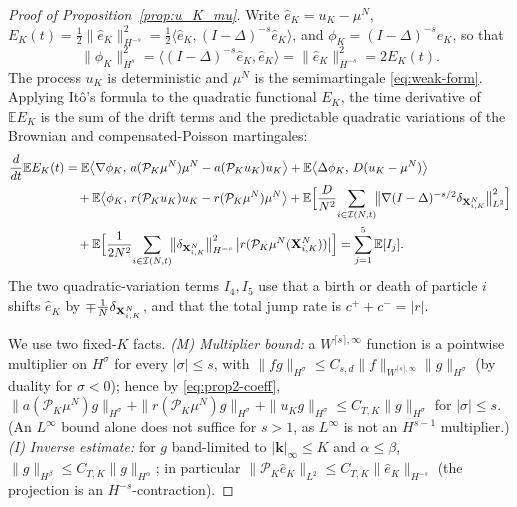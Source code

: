 \documentclass[a4paper,fleqn]{cas-sc}
\theoremstyle{definition}
\theoremstyle{remark}
\begin{document}
\begin{proof}[Proof of Proposition~\ref{prop:u_K_mu}]
Write $\hat e_K=u_K-\mu^N$, $E_K(t)=\tfrac12\|\hat e_K\|_{H^{-s}}^2
=\tfrac12\langle\hat e_K,(I-\Delta)^{-s}\hat e_K\rangle$, and
$\phi_K=(I-\Delta)^{-s}\hat e_K$, so that
\begin{equation}\label{eq:app-phi-id}
\|\phi_K\|_{H^s}^2=\langle(I-\Delta)^{-s}\hat e_K,\hat e_K\rangle=\|\hat e_K\|_{H^{-s}}^2=2E_K(t).
\end{equation}
The process $u_K$ is deterministic and $\mu^N$ is the semimartingale
\eqref{eq:weak-form}. Applying It\^o's formula to the quadratic functional $E_K$,
the time derivative of $\mathbb EE_K$ is the sum of the drift terms and the
predictable quadratic variations of the Brownian and compensated-Poisson
martingales:
\[
\begin{aligned}
\frac{d}{dt}\mathbb EE_K(t)
&=\mathbb E\bigl\langle\nabla\phi_K,\,a(\mathcal P_K\mu^N)\mu^N-a(\mathcal P_K u_K)u_K\bigr\rangle
 +\mathbb E\bigl\langle\Delta\phi_K,\,D(u_K-\mu^N)\bigr\rangle\\
&\quad+\mathbb E\bigl\langle\phi_K,\,r(\mathcal P_K u_K)u_K-r(\mathcal P_K\mu^N)\mu^N\bigr\rangle
 +\mathbb E\Bigl[\frac{D}{N^2}\!\sum_{i\in\mathcal I(N,t)}\!\bigl\|\nabla(I-\Delta)^{-s/2}\delta_{\mathbf{X}^N_{i,K}}\bigr\|_{L^2}^2\Bigr]\\
&\quad+\mathbb E\Bigl[\frac{1}{2N^2}\!\sum_{i\in\mathcal I(N,t)}\!\bigl\|\delta_{\mathbf{X}^N_{i,K}}\bigr\|_{H^{-s}}^2\,\bigl|r(\mathcal P_K\mu^N(\mathbf{X}^N_{i,K}))\bigr|\Bigr]
=\sum_{j=1}^5\mathbb E[I_j].
\end{aligned}
\]
The two quadratic-variation terms $I_4,I_5$ use that a birth or death of particle
$i$ shifts $\hat e_K$ by $\mp\tfrac1N\delta_{\mathbf{X}^N_{i,K}}$, and that the total
jump rate is $c^++c^-=|r|$.

We use two fixed-$K$ facts.
\emph{(M) Multiplier bound:} a $W^{\lceil s\rceil,\infty}$ function is a pointwise
multiplier on $H^\sigma$ for every $|\sigma|\le s$, with
$\|fg\|_{H^\sigma}\le C_{s,d}\|f\|_{W^{\lceil s\rceil,\infty}}\|g\|_{H^\sigma}$ (by
duality for $\sigma<0$); hence by \eqref{eq:prop2-coeff},
$\|a(\mathcal P_K\mu^N)g\|_{H^\sigma}+\|r(\mathcal P_K\mu^N)g\|_{H^\sigma}+\|u_K g\|_{H^\sigma}\le C_{T,K}\|g\|_{H^\sigma}$
for $|\sigma|\le s$. (An $L^\infty$ bound alone does not suffice for $s>1$, as
$L^\infty$ is not an $H^{s-1}$ multiplier.)
\emph{(I) Inverse estimate:} for $g$ band-limited to $|\mathbf k|_\infty\le K$ and
$\alpha\le\beta$, $\|g\|_{H^\beta}\le C_{T,K}\|g\|_{H^\alpha}$; in particular
$\|\mathcal P_K\hat e_K\|_{L^2}\le C_{T,K}\|\hat e_K\|_{H^{-s}}$ (the projection is an
$H^{-s}$-contraction).


\end{proof}
\end{document}
